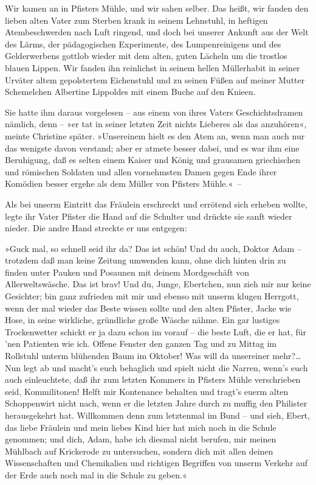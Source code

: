 Wir kamen an in Pfisters Mühle, und wir sahen selber. Das heißt,
wir fanden den lieben alten Vater zum Sterben krank in seinem
Lehnstuhl, in heftigen Atembeschwerden nach Luft ringend, und doch
bei unserer Ankunft aus der Welt des Lärms, der pädagogischen
Experimente, des Lumpenreinigens und des Gelderwerbens gottlob
wieder mit dem alten, guten Lächeln um die trostlos blauen Lippen.
Wir fanden ihn reinlichst in seinem hellen Müllerhabit in seiner
Urväter altem gepolstertem Eichenstuhl und zu seinen Füßen auf
meiner Mutter Schemelchen Albertine Lippoldes mit einem Buche auf
den Knieen.

Sie hatte ihm daraus vorgelesen – aus einem von ihres Vaters
Geschichtsdramen nämlich, denn – »er tat in seiner letzten Zeit
nichts Lieberes als das anzuhören«, meinte Christine später.
»Unsereinem hielt es den Atem an, wenn man auch nur das wenigste
davon verstand; aber er atmete besser dabei, und es war ihm eine
Beruhigung, daß es selten einem Kaiser und König und grausamen
griechischen und römischen Soldaten und allen vornehmsten Damen
gegen Ende ihrer Komödien besser ergehe als dem Müller von Pfisters
Mühle.«~–

Als bei unserm Eintritt das Fräulein erschreckt und errötend sich
erheben wollte, legte ihr Vater Pfister die Hand auf die Schulter
und drückte sie sanft wieder nieder. Die andre Hand streckte er uns
entgegen:

»Guck mal, so schnell seid ihr da? Das ist schön! Und du auch,
Doktor Adam – trotzdem daß man keine Zeitung umwenden kann, ohne
dich hinten drin zu finden unter Pauken und Posaunen mit deinem
Mordgeschäft von Allerweltswäsche. Das ist brav! Und du, Junge,
Ebertchen, nun zieh mir nur keine Gesichter; bin ganz zufrieden mit
mir und ebenso mit unserm klugen Herrgott, wenn der mal wieder das
Beste wissen sollte und den alten Pfister, Jacke wie Hose, in seine
wirkliche, gründliche große Wäsche nähme. Ein gar lustiges
Trockenwetter schickt er ja dazu schon im vorauf – die beste Luft,
die er hat, für 'nen Patienten wie ich. Offene Fenster den ganzen
Tag und zu Mittag im Rollstuhl unterm blühenden Baum im Oktober!
Was will da unsereiner mehr?\ldots{} Nun legt ab und macht's euch
behaglich und spielt nicht die Narren, wenn's euch auch
einleuchtete, daß ihr zum letzten Kommers in Pfisters Mühle
verschrieben seid, Kommilitonen! Helft mir Kontenance behalten und
tragt's euerm alten Schoppenwirt nicht nach, wenn er die letzten
Jahre durch zu muffig den Philister herausgekehrt hat. Willkommen
denn zum letztenmal im Bund – und sieh, Ebert, das liebe Fräulein
und mein liebes Kind hier hat mich noch in die Schule genommen; und
dich, Adam, habe ich diesmal nicht berufen, mir meinen Mühlbach auf
Krickerode zu untersuchen, sondern dich mit allen deinen
Wissenschaften und Chemikalien und richtigen Begriffen von unserm
Verkehr auf der Erde auch noch mal in die Schule zu geben.«

